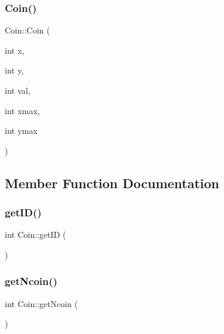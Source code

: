 \mbox{\label{class_coin_a15165b502ff8217f0d85df18a9a30179}} 
\subsubsection{\texorpdfstring{Coin()}{Coin()}\hspace{0.1cm}{\footnotesize\ttfamily [2/2]}}
{\footnotesize\ttfamily Coin\+::\+Coin (\begin{DoxyParamCaption}\item[{int}]{x,  }\item[{int}]{y,  }\item[{int}]{val,  }\item[{int}]{xmax,  }\item[{int}]{ymax }\end{DoxyParamCaption})}



\subsection{Member Function Documentation}
\mbox{\label{class_coin_ad0a324384f93ebe7ef0b9786f1ceaae4}} 
\subsubsection{\texorpdfstring{get\+I\+D()}{getID()}}
{\footnotesize\ttfamily int Coin\+::get\+ID (\begin{DoxyParamCaption}{ }\end{DoxyParamCaption})}

\mbox{\label{class_coin_a218706448b94dbdf9299603f2195c064}} 
\subsubsection{\texorpdfstring{get\+Ncoin()}{getNcoin()}}
{\footnotesize\ttfamily int Coin\+::get\+Ncoin (\begin{DoxyParamCaption}{ }\end{DoxyParamCaption})}

\mbox{\label{class_coin_a53c8bf65afdde1422cfda51d753d74b7}} 
